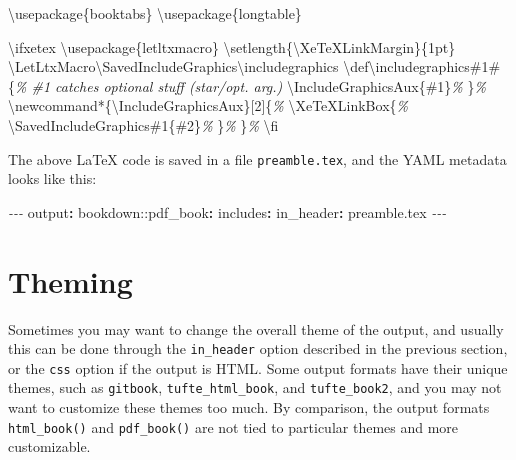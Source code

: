 \documentclass[
  12pt,
]{krantz}
\newenvironment{Shaded}{\begin{snugshade}}{\end{snugshade}}
\newcommand{\AttributeTok}[1]{\textcolor[rgb]{0.77,0.63,0.00}{#1}}
\newcommand{\BuiltInTok}[1]{#1}
\newcommand{\CommentTok}[1]{\textcolor[rgb]{0.56,0.35,0.01}{\textit{#1}}}
\newcommand{\ExtensionTok}[1]{#1}
\newcommand{\FunctionTok}[1]{\textcolor[rgb]{0.00,0.00,0.00}{#1}}
\newcommand{\KeywordTok}[1]{\textcolor[rgb]{0.13,0.29,0.53}{\textbf{#1}}}
\newcommand{\NormalTok}[1]{#1}
\newcommand{\PreprocessorTok}[1]{\textcolor[rgb]{0.56,0.35,0.01}{\textit{#1}}}
\theoremstyle{definition}
\theoremstyle{definition}
\theoremstyle{definition}
\theoremstyle{definition}
\theoremstyle{remark}
\begin{document}
\begin{Shaded}
\begin{Highlighting}[]
\BuiltInTok{\textbackslash{}usepackage}\NormalTok{\{}\ExtensionTok{booktabs}\NormalTok{\}}
\BuiltInTok{\textbackslash{}usepackage}\NormalTok{\{}\ExtensionTok{longtable}\NormalTok{\}}

\FunctionTok{\textbackslash{}ifxetex}
  \BuiltInTok{\textbackslash{}usepackage}\NormalTok{\{}\ExtensionTok{letltxmacro}\NormalTok{\}}
  \FunctionTok{\textbackslash{}setlength}\NormalTok{\{}\FunctionTok{\textbackslash{}XeTeXLinkMargin}\NormalTok{\}\{1pt\}}
  \FunctionTok{\textbackslash{}LetLtxMacro\textbackslash{}SavedIncludeGraphics\textbackslash{}includegraphics}
  \FunctionTok{\textbackslash{}def\textbackslash{}includegraphics}\NormalTok{\#1\#\{}\CommentTok{\% \#1 catches optional stuff (star/opt. arg.)}
    \FunctionTok{\textbackslash{}IncludeGraphicsAux}\NormalTok{\{\#1\}}\CommentTok{\%}
\NormalTok{  \}}\CommentTok{\%}
  \FunctionTok{\textbackslash{}newcommand*}\NormalTok{\{}\ExtensionTok{\textbackslash{}IncludeGraphicsAux}\NormalTok{\}[2]\{}\CommentTok{\%}
    \FunctionTok{\textbackslash{}XeTeXLinkBox}\NormalTok{\{}\CommentTok{\%}
      \FunctionTok{\textbackslash{}SavedIncludeGraphics}\NormalTok{\#1\{\#2\}}\CommentTok{\%}
\NormalTok{    \}}\CommentTok{\%}
\NormalTok{  \}}\CommentTok{\%}
\FunctionTok{\textbackslash{}fi}
\end{Highlighting}
\end{Shaded}

The above LaTeX code is saved in a file \texttt{preamble.tex}, and the YAML metadata looks like this:

\begin{Shaded}
\begin{Highlighting}[]
\PreprocessorTok{{-}{-}{-}}
\FunctionTok{output}\KeywordTok{:}
\AttributeTok{  bookdown:}\FunctionTok{:pdf\_book}\KeywordTok{:}
\AttributeTok{    }\FunctionTok{includes}\KeywordTok{:}
\AttributeTok{      }\FunctionTok{in\_header}\KeywordTok{:}\AttributeTok{ preamble.tex}
\PreprocessorTok{{-}{-}{-}}
\end{Highlighting}
\end{Shaded}

\hypertarget{theming}{%
\section{Theming}\label{theming}}

Sometimes you may want to change the overall theme of the output, and usually this can be done through the \texttt{in\_header} option described in the previous section, or the \texttt{css} option if the output is HTML. Some output formats have their unique themes, such as \texttt{gitbook}, \texttt{tufte\_html\_book}, and \texttt{tufte\_book2}, and you may not want to customize these themes too much. By comparison, the output formats \texttt{html\_book()} and \texttt{pdf\_book()} are not tied to particular themes and more customizable.
\end{document}
